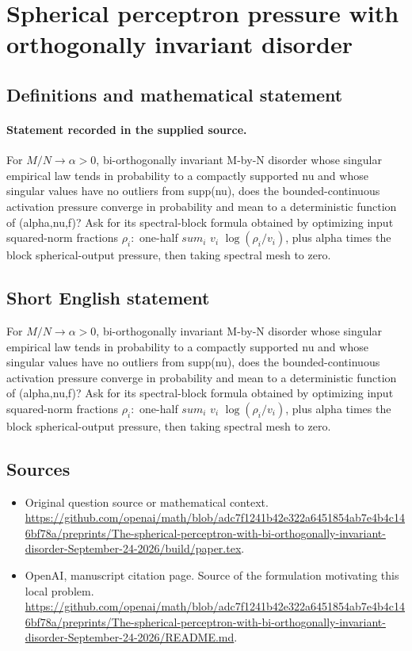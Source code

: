 \documentclass[11pt]{article}
\begin{document}
\section*{Spherical perceptron pressure with orthogonally invariant disorder}\label{30007373}
\subsection{Definitions and mathematical statement}
\paragraph{Statement recorded in the supplied source.}
For $M/N\to \alpha >0$, bi-orthogonally invariant M-by-N disorder whose singular empirical law tends in probability to a compactly supported nu and whose singular values have no outliers from supp(nu), does the bounded-continuous activation pressure converge in probability and mean to a deterministic function of (alpha,nu,f)? Ask for its spectral-block formula obtained by optimizing input squared-norm fractions $\rho _i:$ one-half $sum_i$ $v_i$ $\log (\rho _i/v_i)$, plus alpha times the block spherical-output pressure, then taking spectral mesh to zero.
\subsection{Short English statement}
For $M/N\to \alpha >0$, bi-orthogonally invariant M-by-N disorder whose singular empirical law tends in probability to a compactly supported nu and whose singular values have no outliers from supp(nu), does the bounded-continuous activation pressure converge in probability and mean to a deterministic function of (alpha,nu,f)? Ask for its spectral-block formula obtained by optimizing input squared-norm fractions $\rho _i:$ one-half $sum_i$ $v_i$ $\log (\rho _i/v_i)$, plus alpha times the block spherical-output pressure, then taking spectral mesh to zero.
\subsection{Sources}
\begin{itemize}
\item[S1] Original question source or mathematical context.
\url{https://github.com/openai/math/blob/adc7f1241b42e322a6451854ab7e4b4c146bf78a/preprints/The-spherical-perceptron-with-bi-orthogonally-invariant-disorder-September-24-2026/build/paper.tex}.
\item[S2] OpenAI, manuscript citation page. Source of the formulation motivating this local problem.
\url{https://github.com/openai/math/blob/adc7f1241b42e322a6451854ab7e4b4c146bf78a/preprints/The-spherical-perceptron-with-bi-orthogonally-invariant-disorder-September-24-2026/README.md}.
\end{itemize}
\end{document}
